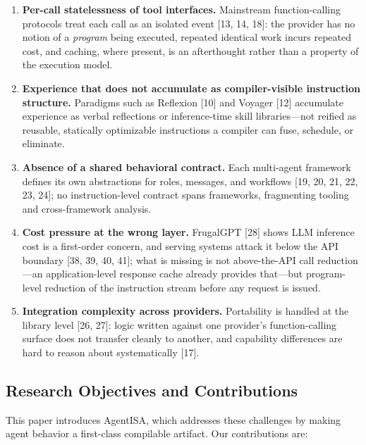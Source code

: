 \documentclass[
  sigconf,
  anonymous]{acmart}
\begin{document}
\begin{enumerate}
\def\labelenumi{\arabic{enumi}.}
\item
  \textbf{Per-call statelessness of tool interfaces.} Mainstream
  function-calling protocols treat each call as an isolated event {[}13,
  14, 18{]}: the provider has no notion of a \emph{program} being
  executed, repeated identical work incurs repeated cost, and caching,
  where present, is an afterthought rather than a property of the
  execution model.
\item
  \textbf{Experience that does not accumulate as compiler-visible
  instruction structure.} Paradigms such as Reflexion {[}10{]} and
  Voyager {[}12{]} accumulate experience as verbal reflections or
  inference-time skill libraries---not reified as reusable, statically
  optimizable instructions a compiler can fuse, schedule, or eliminate.
\item
  \textbf{Absence of a shared behavioral contract.} Each multi-agent
  framework defines its own abstractions for roles, messages, and
  workflows {[}19, 20, 21, 22, 23, 24{]}; no instruction-level contract
  spans frameworks, fragmenting tooling and cross-framework analysis.
\item
  \textbf{Cost pressure at the wrong layer.} FrugalGPT {[}28{]} shows
  LLM inference cost is a first-order concern, and serving systems
  attack it below the API boundary {[}38, 39, 40, 41{]}; what is missing
  is not above-the-API call reduction---an application-level response
  cache already provides that---but program-level reduction of the
  instruction stream before any request is issued.
\item
  \textbf{Integration complexity across providers.} Portability is
  handled at the library level {[}26, 27{]}: logic written against one
  provider's function-calling surface does not transfer cleanly to
  another, and capability differences are hard to reason about
  systematically {[}17{]}.
\end{enumerate}

\subsection{Research Objectives and
Contributions}\label{research-objectives-and-contributions}

This paper introduces AgentISA, which addresses these challenges by
making agent behavior a first-class compilable artifact. Our
contributions are:
\end{document}
